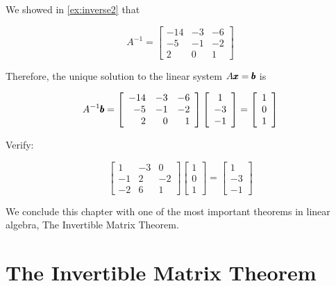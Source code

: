 \begin{solution} We showed in \autoref{ex:inverse2} that

    \[
    A^{-1}=\left[\begin{array}{rrr}
    -14 & -3 & -6 \\
    -5 & -1 & -2 \\
    2 & 0 & 1
    \end{array}\right]
    \]

Therefore, the unique solution to the linear system $A \pmb{x} = \pmb{b}$ is

    \[
    A^{-1} \pmb{b}=\left[\begin{array}{rrr}
    -14 & -3 & -6 \\
    -5 & -1 & -2 \\
    2 & 0 & 1
    \end{array}\right]\left[\begin{array}{c}
    1 \\
    -3 \\
    -1
    \end{array}\right]=\left[\begin{array}{l}
    1 \\
    0 \\
    1
    \end{array}\right]
    \]

Verify:

    \[
    \left[\begin{array}{rrr}
    1 & -3 & 0 \\
    -1 & 2 & -2 \\
    -2 & 6 & 1
    \end{array}\right]\left[\begin{array}{l}
    1 \\
    0 \\
    1
    \end{array}\right]=\left[\begin{array}{c}
    1 \\
    -3 \\
    -1
    \end{array}\right]
    \]
\end{solution}

We conclude this chapter with one of the most important theorems in linear algebra, The Invertible Matrix Theorem.

\section{The Invertible Matrix Theorem}

